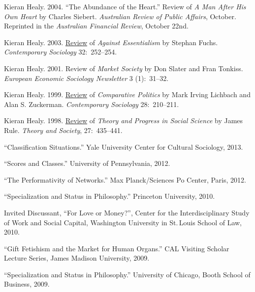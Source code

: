 \documentclass[11pt,article,oneside]{memoir}
\begin{document}
\ind  Kieran Healy. 2004. ``The Abundance of the Heart.'' Review of \emph{A Man After His Own Heart} by Charles
Siebert. \emph{Australian Review of Public Affairs}, October. Reprinted in the
\emph{Australian Financial Review}, October 22nd.

\ind  Kieran Healy. 2003. \href{http://links.jstor.org/sici?sici=0094-3061%28200303%2932%3A2%3C252%3AAEATOC%3E2.0.CO%3B2-F}{Review} of \emph{Against Essentialism} by Stephan Fuchs.
\emph{Contemporary Sociology} 32:~252--254.

\ind  Kieran Healy. 2001. Review of \emph{Market Society} by Don Slater and Fran Tonkiss. \emph{European Economic Sociology Newsletter} 3 (1):~31--32.


\ind  Kieran Healy. 1999. \href{http://links.jstor.org/sici?sici=0094-3061%28199903%2928%3A2%3C210%3ACPRCAS%3E2.0.CO%3B2-C}{Review} of \emph{Comparative Politics} by Mark Irving Lichbach and Alan S.
Zuckerman. \emph{Contemporary Sociology} 28:~210--211.


\ind  Kieran Healy. 1998. \href{http://www.kieranhealy.org/files/reviews/rule.pdf}{Review} of \emph{Theory and Progress in Social Science} by James Rule.  \emph{Theory
  and Society}, 27:~435--441.

 
 \bigskip

\medskip


\ind ``Classification Situations.'' Yale University Center for Cultural Sociology, 2013.
 
\ind ``Scores and Classes.'' University of Pennsylvania, 2012.

\ind ``The Performativity of Networks.'' Max Planck/Sciences Po Center, Paris, 2012. 
 
\ind ``Specialization and Status in Philosophy.'' Princeton University, 2010. 

\ind Invited Discussant, ``For Love or Money?'', Center for the Interdisciplinary Study of Work and Social Capital, Washington University in St.\,Louis School of Law, 2010. 

\ind ``Gift Fetishism and the Market for Human Organs.'' CAL Visiting Scholar Lecture Series, James Madison University, 2009. 

\ind ``Specialization and Status in Philosophy.'' University of Chicago, Booth School of Business, 2009. 
\end{document}
